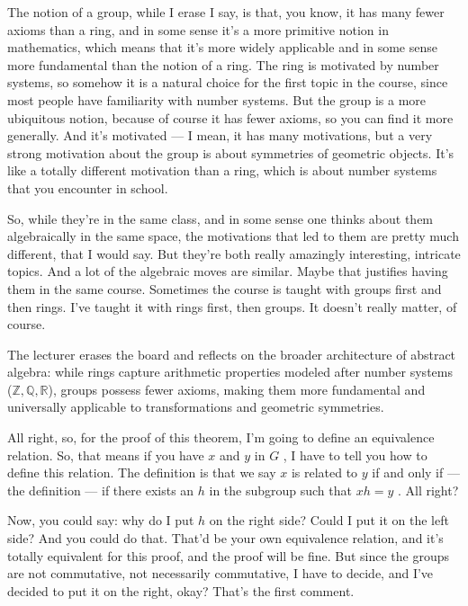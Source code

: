 \begin{speech}[00:13:17 - 00:14:52]
The notion of a group, while I erase I say, is that, you know, it has many fewer axioms than a ring, and in some sense it's a more primitive notion in mathematics, which means that it's more widely applicable and in some sense more fundamental than the notion of a ring. The ring is motivated by number systems, so somehow it is a natural choice for the first topic in the course, since most people have familiarity with number systems. But the group is a more ubiquitous notion, because of course it has fewer axioms, so you can find it more generally. And it's motivated --- I mean, it has many motivations, but a very strong motivation about the group is about symmetries of geometric objects. It's like a totally different motivation than a ring, which is about number systems that you encounter in school.

So, while they're in the same class, and in some sense one thinks about them algebraically in the same space, the motivations that led to them are pretty much different, that I would say. But they're both really amazingly interesting, intricate topics. And a lot of the algebraic moves are similar. Maybe that justifies having them in the same course. Sometimes the course is taught with groups first and then rings. I've taught it with rings first, then groups. It doesn't really matter, of course.
\end{speech}

\begin{note}
The lecturer erases the board and reflects on the broader architecture of abstract algebra: while rings capture arithmetic properties modeled after number systems ($\mathbb{Z}, \mathbb{Q}, \mathbb{R}$), groups possess fewer axioms, making them more fundamental and universally applicable to transformations and geometric symmetries.
\end{note}

\begin{speech}[00:14:52 - 00:16:00]
All right, so, for the proof of this theorem, I'm going to define an equivalence relation. So, that means if you have $x$ and $y$ in $G$ , I have to tell you how to define this relation. The definition  is that we say $x$ is related to $y$ if and only if --- the definition --- if there exists an $h$ in the subgroup  such that $xh = y$ . All right?

Now, you could say: why do I put $h$ on the right side? Could I put it on the left side? And you could do that. That'd be your own equivalence relation, and it's totally equivalent for this proof, and the proof will be fine. But since the groups are not commutative, not necessarily commutative, I have to decide, and I've decided to put it on the right, okay? That's the first comment.
\end{speech}


